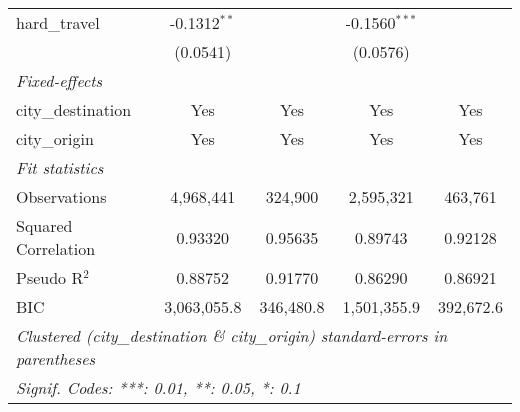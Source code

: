 \begin{tabular}{lcccc}
   hard\_travel        & -0.1312$^{**}$  &                 & -0.1560$^{***}$ &   \\   
                       & (0.0541)        &                 & (0.0576)        &   \\   
   \midrule
   \emph{Fixed-effects}\\
   city\_destination   & Yes             & Yes             & Yes             & Yes\\  
   city\_origin        & Yes             & Yes             & Yes             & Yes\\  
   \midrule
   \emph{Fit statistics}\\
   Observations        & 4,968,441       & 324,900         & 2,595,321       & 463,761\\  
   Squared Correlation & 0.93320         & 0.95635         & 0.89743         & 0.92128\\  
   Pseudo R$^2$        & 0.88752         & 0.91770         & 0.86290         & 0.86921\\  
   BIC                 & 3,063,055.8     & 346,480.8       & 1,501,355.9     & 392,672.6\\  
   \midrule \midrule
   \multicolumn{5}{l}{\emph{Clustered (city\_destination \& city\_origin) standard-errors in parentheses}}\\
   \multicolumn{5}{l}{\emph{Signif. Codes: ***: 0.01, **: 0.05, *: 0.1}}\\
\end{tabular}
\par\endgroup


